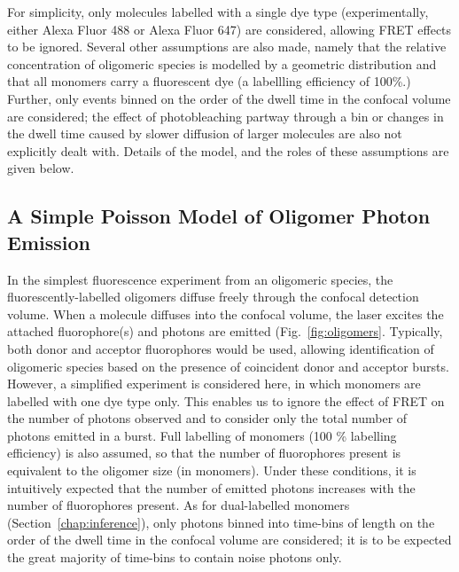 For simplicity, only molecules labelled with a single dye type (experimentally, either Alexa Fluor 488 or Alexa Fluor 647) are considered, allowing FRET effects to be ignored. Several other assumptions are also made, namely that the relative concentration of oligomeric species is modelled by a geometric distribution and that all monomers carry a fluorescent dye (a labellling efficiency of 100\%.) Further, only events binned on the order of the dwell time in the confocal volume are considered; the effect of photobleaching partway through a bin or changes in the dwell time caused by slower diffusion of larger molecules are also not explicitly dealt with. Details of the model, and the roles of these assumptions are given below.

\subsection{A Simple Poisson Model of Oligomer Photon Emission}
In the simplest fluorescence experiment from an oligomeric species, the fluorescently-labelled oligomers diffuse freely through the confocal detection volume.  When a molecule diffuses into the confocal volume, the laser excites the attached fluorophore(s) and photons are emitted (Fig.~\ref{fig:oligomers}. Typically, both donor and acceptor fluorophores would be used, allowing identification of oligomeric species based on the presence of coincident donor and acceptor bursts. However, a simplified experiment is considered here, in which monomers are labelled with one dye type only. This enables us to ignore the effect of FRET on the number of photons observed and to consider only the total number of photons emitted in a burst. Full labelling of monomers (100 \% labelling efficiency) is also assumed, so that the number of fluorophores present is equivalent to the oligomer size (in monomers). Under these conditions, it is intuitively expected that the number of emitted photons increases with the number of fluorophores present. As for dual-labelled monomers (Section~\ref{chap:inference}), only photons binned into time-bins of length on the order of the dwell time in the confocal volume are considered; it is to be expected the great majority of time-bins to contain noise photons only.

